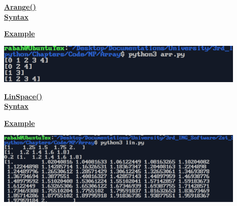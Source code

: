 \vspace{1cm}
\textbf{\underline{Arange()}}\\[0.05cm]
\textbf{\underline{Syntax}}\\[0.1cm]


\vspace{0.5cm}

\textbf{\underline{Example}}\\[0.1cm]


\newpage

\vspace{0.25cm}
\begin{center}
    \includegraphics[width = 0.9\textwidth]{Chapters/ScreenShot/NP/Array/arOutput.png}
\end{center}

\vspace{1cm}



\textbf{\underline{LinSpace()}}\\[0.05cm]
\textbf{\underline{Syntax}}\\[0.1cm]


\vspace{0.5cm}

\textbf{\underline{Example}}\\[0.1cm]


\vspace{0.25cm}
\begin{center}
    \includegraphics[width = 0.9\textwidth]{Chapters/ScreenShot/NP/Array/linOutput.png}
\end{center}

\vspace{1cm}

